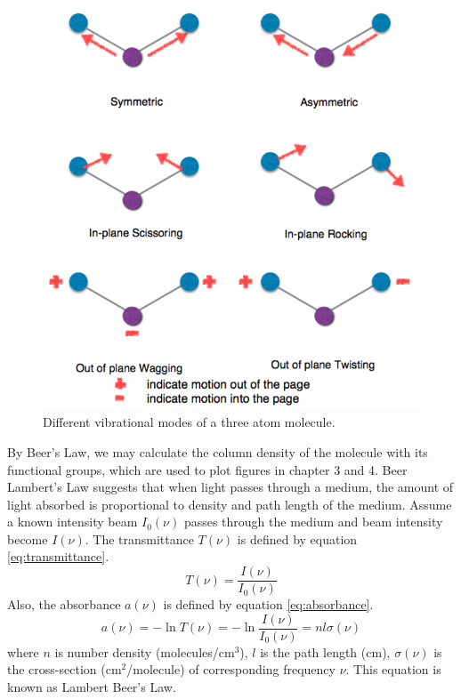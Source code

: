 \begin{figure}
\centering
\includegraphics[width=\textwidth]{figures/chapter2/vibration.png}
\caption{Different vibrational modes of a three atom molecule.}
\label{fig:vibration}
\end{figure}

By Beer’s Law, we may calculate the column density of the molecule with its functional groups, which are used to plot figures in chapter 3 and 4. Beer Lambert’s Law suggests that when light passes through a medium, the amount of light absorbed is proportional to density and path length of the medium. Assume a known intensity beam $I_{0}(\nu)$ passes through the medium and beam intensity become $I(\nu)$. The transmittance $T(\nu)$ is defined by equation \ref{eq:transmittance}. \\
\begin{equation}
T(\nu) = \frac{I(\nu)}{I_{0}(\nu)}
\label{eq:transmittance}
\end{equation}
Also, the absorbance $a(\nu)$ is defined by equation \ref{eq:absorbance}. \\
\begin{equation}
a(\nu) = - \ln T(\nu) = - \ln \frac{I(\nu)}{I_{0}(\nu)} = n l \sigma(\nu)
\label{eq:absorbance}
\end{equation}
where $n$ is number density (molecules/cm$^3$), $l$ is the path length (cm), $\sigma(\nu)$ is the cross-section (cm$^2$/molecule) of corresponding frequency $\nu$. This equation is known as Lambert Beer’s Law. \\


